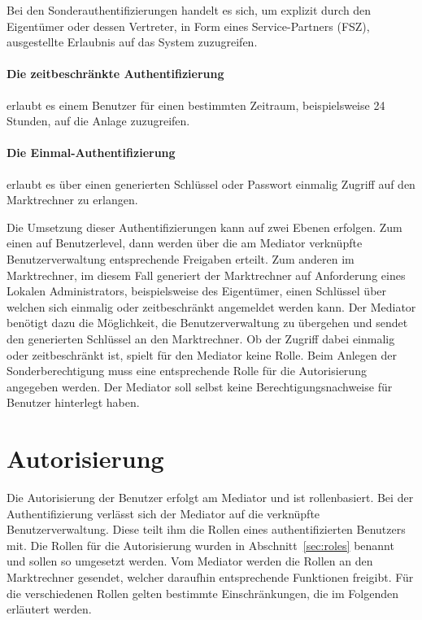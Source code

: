 \documentclass[11pt,a4paper]{report}
\begin{document}
Bei den Sonderauthentifizierungen handelt es sich, um explizit durch den Eigentümer oder dessen Vertreter, in Form eines Service-Partners (FSZ), ausgestellte Erlaubnis auf das System zuzugreifen.

\paragraph{Die zeitbeschränkte Authentifizierung} erlaubt es einem Benutzer für einen bestimmten Zeitraum, beispielsweise 24 Stunden, auf die Anlage zuzugreifen. 

\paragraph{Die Einmal-Authentifizierung} erlaubt es über einen generierten Schlüssel oder Passwort einmalig Zugriff auf den Marktrechner zu erlangen.

Die Umsetzung dieser Authentifizierungen kann auf zwei Ebenen erfolgen. Zum einen auf Benutzerlevel, dann werden über die am Mediator verknüpfte Benutzerverwaltung entsprechende Freigaben erteilt. Zum anderen im Marktrechner, im diesem Fall generiert der Marktrechner auf Anforderung eines Lokalen Administrators, beispielsweise des Eigentümer, einen Schlüssel über welchen sich einmalig oder zeitbeschränkt angemeldet werden kann. Der Mediator benötigt dazu die Möglichkeit, die Benutzerverwaltung zu übergehen und sendet den generierten Schlüssel an den Marktrechner. Ob der Zugriff dabei einmalig oder zeitbeschränkt ist, spielt für den Mediator keine Rolle. Beim Anlegen der Sonderberechtigung muss eine entsprechende Rolle für die Autorisierung angegeben werden. Der Mediator soll selbst keine Berechtigungsnachweise für Benutzer hinterlegt haben.

\section{Autorisierung}

Die Autorisierung der Benutzer erfolgt am Mediator und ist rollenbasiert. Bei der Authentifizierung verlässt sich der Mediator auf die verknüpfte Benutzerverwaltung. Diese teilt ihm die Rollen eines authentifizierten Benutzers mit. Die Rollen für die Autorisierung wurden in Abschnitt~\ref{sec:roles} benannt und sollen so umgesetzt werden. Vom Mediator  werden die Rollen an den Marktrechner gesendet, welcher daraufhin entsprechende Funktionen freigibt. Für die verschiedenen Rollen gelten bestimmte Einschränkungen, die im Folgenden erläutert werden.
\end{document}
